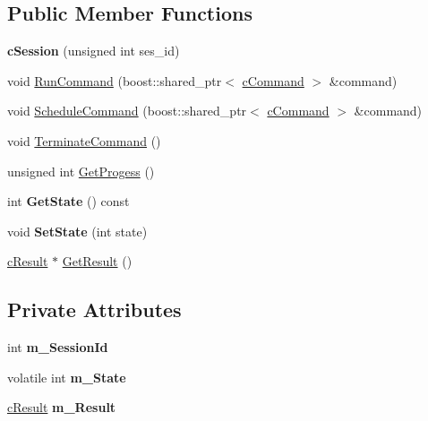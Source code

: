 \subsection*{\-Public \-Member \-Functions}
\begin{DoxyCompactItemize}
\item 
\hypertarget{classengine_1_1cSession_aafe0e5fd946fd5fa5b990617f848a5a5}{{\bfseries c\-Session} (unsigned int ses\-\_\-id)}\label{classengine_1_1cSession_aafe0e5fd946fd5fa5b990617f848a5a5}

\item 
void \hyperlink{classengine_1_1cSession_ab8f8f48c8c2baeec48c46e039105fee9}{\-Run\-Command} (boost\-::shared\-\_\-ptr$<$ \hyperlink{classengine_1_1cCommand}{c\-Command} $>$ \&command)
\item 
void \hyperlink{classengine_1_1cSession_af7905e76577cecec7e01a8f2967f371b}{\-Schedule\-Command} (boost\-::shared\-\_\-ptr$<$ \hyperlink{classengine_1_1cCommand}{c\-Command} $>$ \&command)
\item 
void \hyperlink{classengine_1_1cSession_af1a1747cd7020bd4bfce782bf1ffec5d}{\-Terminate\-Command} ()
\item 
unsigned int \hyperlink{classengine_1_1cSession_ab5b73d57f8d6fd918d33b4e0a64c21d9}{\-Get\-Progess} ()
\item 
\hypertarget{classengine_1_1cSession_a4d5cfbd1a1a5d1ff022fd4915b256f4f}{int {\bfseries \-Get\-State} () const }\label{classengine_1_1cSession_a4d5cfbd1a1a5d1ff022fd4915b256f4f}

\item 
\hypertarget{classengine_1_1cSession_ac70dfa95b25fed14a6ca32df68cf1300}{void {\bfseries \-Set\-State} (int state)}\label{classengine_1_1cSession_ac70dfa95b25fed14a6ca32df68cf1300}

\item 
\hyperlink{classengine_1_1cResult}{c\-Result} $\ast$ \hyperlink{classengine_1_1cSession_aa403617485890fe288c5cf68b39ab540}{\-Get\-Result} ()
\end{DoxyCompactItemize}
\subsection*{\-Private \-Attributes}
\begin{DoxyCompactItemize}
\item 
\hypertarget{classengine_1_1cSession_a4adc27ebd913c027b736e9aa2f4142cb}{int {\bfseries m\-\_\-\-Session\-Id}}\label{classengine_1_1cSession_a4adc27ebd913c027b736e9aa2f4142cb}

\item 
\hypertarget{classengine_1_1cSession_af0edf0e0ced62ee7e8a5136637cc0084}{volatile int {\bfseries m\-\_\-\-State}}\label{classengine_1_1cSession_af0edf0e0ced62ee7e8a5136637cc0084}

\item 
\hypertarget{classengine_1_1cSession_abfc019aab8f8453fd7589266c0e00ef7}{\hyperlink{classengine_1_1cResult}{c\-Result} {\bfseries m\-\_\-\-Result}}\label{classengine_1_1cSession_abfc019aab8f8453fd7589266c0e00ef7}

\end{DoxyCompactItemize}
